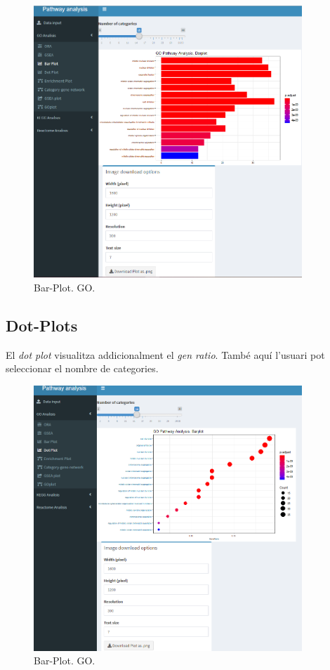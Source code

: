 \documentclass[]{article}
\begin{document}
\begin{figure}[H]
\centering
\includegraphics[width=0.9\textwidth]{App_F14_Items_GO_BarPlot.png} 
\caption{Bar-Plot. GO.}
\end{figure}

\subsection{Dot-Plots}

El \textit{dot plot} visualitza addicionalment el \textit{gen ratio}. També aquí l'usuari pot seleccionar el nombre de categories.


\begin{figure}[H]
\centering
\includegraphics[width=0.9\textwidth]{App_F15_Items_GO_DotPlot.png} 
\caption{Bar-Plot. GO.}
\end{figure}
\end{document}
